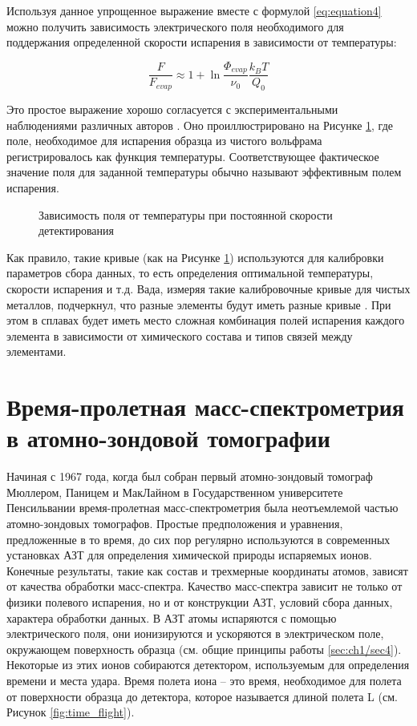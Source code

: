 Используя данное упрощенное выражение вместе с формулой \cref{eq:equation4} можно получить зависимость электрического поля необходимого для поддержания определенной скорости испарения в зависимости от температуры:

\begin{equation}
	\label{eq:equation7}
	\frac{F}{F_{evap}} \approx 1 + \ln{\frac{\Phi_{evap}}{\nu_0}\frac{k_B T}{Q_0}}
\end{equation}

Это простое выражение хорошо согласуется с экспериментальными наблюдениями различных авторов \cite{Kellogg84,Kellogg81,Wada84,Kellogg80,Vurpillot06}. Оно проиллюстрировано на Рисунке  \cref{fig:field_temp}, где поле, необходимое для испарения образца из чистого вольфрама регистрировалось как функция температуры. Соответствующее фактическое значение поля для заданной температуры обычно называют эффективным полем испарения.

\begin{figure}[ht]
	\caption{Зависимость поля от температуры при постоянной скорости детектирования \cite{Vurpillot06}}
	\label{fig:field_temp}
\end{figure} 

Как правило, такие кривые (как на Рисунке \cref{fig:field_temp}) используются для калибровки параметров сбора данных, то есть определения оптимальной температуры, скорости испарения и т.д. Вада, измеряя такие калибровочные кривые для чистых металлов, подчеркнул, что разные элементы будут иметь разные кривые \cite{Wada84}. При этом в сплавах будет иметь место сложная комбинация полей испарения каждого элемента в зависимости от химического состава и типов связей между элементами.

\FloatBarrier

\section{Время-пролетная масс-спектрометрия в атомно-зондовой томографии}\label{sec:ch1/sec2}

Начиная с  1967 года, когда был собран первый атомно-зондовый томограф Мюллером, Паницем и МакЛайном в Государственном университете Пенсильвании \cite{Muller68} время-пролетная масс-спектрометрия была неотъемлемой частью атомно-зондовых томографов. Простые предположения и уравнения, предложенные в то время, до сих пор регулярно используются в современных установках АЗТ для определения химической природы испаряемых ионов. Конечные результаты, такие как состав и трехмерные координаты атомов, зависят от качества обработки масс-спектра.
Качество масс-спектра зависит не только от физики полевого испарения, но и от конструкции АЗТ, условий сбора данных, характера обработки данных. В АЗТ атомы испаряются с помощью электрического поля, они ионизируются и ускоряются в электрическом поле, окружающем поверхность образца (см. общие принципы работы \cref{sec:ch1/sec4}). Некоторые из этих ионов собираются детектором, используемым для определения времени и места удара. Время полета иона – это время, необходимое для полета от поверхности образца до детектора, которое называется длиной полета L (см. Рисунок \cref{fig:time_flight}). 

